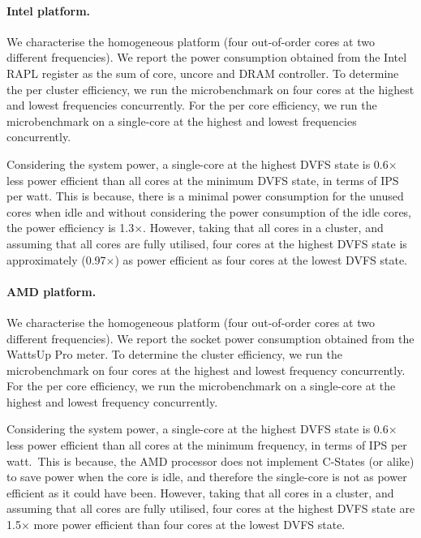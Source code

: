 \paragraph*{Intel platform.} We characterise the homogeneous platform (four out-of-order
cores at two different frequencies). We report the power consumption obtained from the
Intel RAPL register as the sum of core, uncore and DRAM controller.  To determine the per
cluster efficiency, we run the microbenchmark on four cores at the highest and lowest
frequencies concurrently.  For the per core efficiency, we run the microbenchmark on a
single-core at the highest and lowest frequencies concurrently.

Considering the system power, a single-core at the highest DVFS state is 0.6$\times$ less
power efficient than all cores at the minimum DVFS state, in terms of IPS per watt.  This
is because, there is a minimal power consumption for the unused cores when idle and
without considering the power consumption of the idle cores, the power efficiency is
1.3$\times$.  However, taking that all cores in a cluster, and assuming that all cores are
fully utilised, four cores at the highest DVFS state is approximately (0.97$\times$) as
power efficient as four cores at the lowest DVFS state. 

 \paragraph*{AMD platform.} We characterise the homogeneous platform (four
out-of-order cores at two different frequencies). We report the socket power consumption
obtained from the WattsUp Pro meter.  To determine the cluster efficiency, we run the
microbenchmark on four cores at the highest and lowest frequency concurrently.  For the
per core efficiency, we run the microbenchmark on a single-core at the highest and lowest
frequency concurrently.

Considering the system power, a single-core at the highest DVFS state is 0.6$\times$ less
power efficient than all cores at the minimum frequency, in terms of IPS per watt.\ This
is because, the AMD processor does not implement C-States (or alike) to save power when
the core is idle, and therefore the single-core is not as power efficient as it could have
been.  However, taking that all cores in a cluster, and assuming that all cores are fully
utilised, four cores at the highest DVFS state are 1.5$\times$ more power efficient than
four cores at the lowest DVFS state. 


